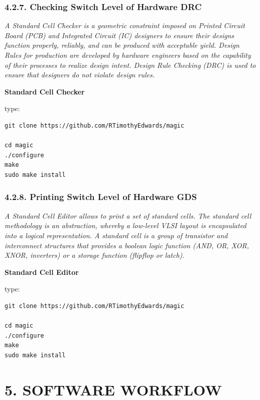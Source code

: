 \documentclass[
]{article}
\begin{document}
\hypertarget{checking-switch-level-of-hardware-drc}{%
\subsubsection{4.2.7. Checking Switch Level of Hardware
DRC}\label{checking-switch-level-of-hardware-drc}}

\emph{A Standard Cell Checker is a geometric constraint imposed on
Printed Circuit Board (PCB) and Integrated Circuit (IC) designers to
ensure their designs function properly, reliably, and can be produced
with acceptable yield. Design Rules for production are developed by
hardware engineers based on the capability of their processes to realize
design intent. Design Rule Checking (DRC) is used to ensure that
designers do not violate design rules.}

\textbf{Standard Cell Checker}

type:

\begin{verbatim}
git clone https://github.com/RTimothyEdwards/magic

cd magic
./configure
make
sudo make install
\end{verbatim}

\hypertarget{printing-switch-level-of-hardware-gds}{%
\subsubsection{4.2.8. Printing Switch Level of Hardware
GDS}\label{printing-switch-level-of-hardware-gds}}

\emph{A Standard Cell Editor allows to print a set of standard cells.
The standard cell methodology is an abstraction, whereby a low-level
VLSI layout is encapsulated into a logical representation. A standard
cell is a group of transistor and interconnect structures that provides
a boolean logic function (AND, OR, XOR, XNOR, inverters) or a storage
function (flipflop or latch).}

\textbf{Standard Cell Editor}

type:

\begin{verbatim}
git clone https://github.com/RTimothyEdwards/magic

cd magic
./configure
make
sudo make install
\end{verbatim}

\hypertarget{software-workflow}{%
\section{5. SOFTWARE WORKFLOW}\label{software-workflow}}
\end{document}
